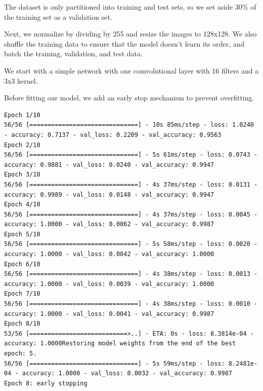 \documentclass{article}
\begin{document}


The dataset is only partitioned into training and test sets, so we set aside 30\% of the training set as a validation set.



Next, we normalize by dividing by 255 and resize the images to 128x128. We also shuffle the training data to ensure that the model doesn't learn its order, and batch the training, validation, and test data.



We start with a simple network with one comvolutional layer with 16 filters and a 3x3 kernel.



Before fitting our model, we add an early stop mechanism to prevent overfitting.



\begin{lstlisting}[style=output]
Epoch 1/10
56/56 [==============================] - 10s 85ms/step - loss: 1.0240 - accuracy: 0.7137 - val_loss: 0.2209 - val_accuracy: 0.9563
Epoch 2/10
56/56 [==============================] - 5s 61ms/step - loss: 0.0743 - accuracy: 0.9881 - val_loss: 0.0240 - val_accuracy: 0.9947
Epoch 3/10
56/56 [==============================] - 4s 37ms/step - loss: 0.0131 - accuracy: 0.9989 - val_loss: 0.0148 - val_accuracy: 0.9947
Epoch 4/10
56/56 [==============================] - 4s 37ms/step - loss: 0.0045 - accuracy: 1.0000 - val_loss: 0.0062 - val_accuracy: 0.9987
Epoch 5/10
56/56 [==============================] - 5s 58ms/step - loss: 0.0020 - accuracy: 1.0000 - val_loss: 0.0042 - val_accuracy: 1.0000
Epoch 6/10
56/56 [==============================] - 4s 38ms/step - loss: 0.0013 - accuracy: 1.0000 - val_loss: 0.0039 - val_accuracy: 1.0000
Epoch 7/10
56/56 [==============================] - 4s 38ms/step - loss: 0.0010 - accuracy: 1.0000 - val_loss: 0.0041 - val_accuracy: 0.9987
Epoch 8/10
53/56 [===========================>..] - ETA: 0s - loss: 8.3814e-04 - accuracy: 1.0000Restoring model weights from the end of the best epoch: 5.
56/56 [==============================] - 5s 59ms/step - loss: 8.2481e-04 - accuracy: 1.0000 - val_loss: 0.0032 - val_accuracy: 0.9987
Epoch 8: early stopping
\end{lstlisting}
\end{document}
